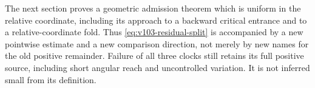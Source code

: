 The next section proves a geometric admission theorem which is
uniform in the relative coordinate, including its approach to a
backward critical entrance and to a relative-coordinate fold. Thus
\eqref{eq:v103-residual-split} is accompanied by a new pointwise
estimate and a new comparison direction, not merely by new names
for the old positive remainder. Failure of all three clocks still
retains its full positive source, including short angular reach and
uncontrolled variation. It is not inferred small from its definition.
